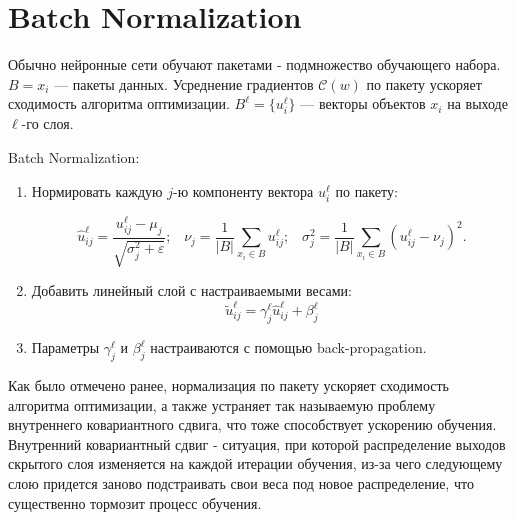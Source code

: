 \documentclass[11pt, oneside]{article}   	%
\begin{document}
	
	\section{Batch Normalization}
	Обычно нейронные сети обучают пакетами - подмножество обучающего набора. $B = {x_i}$ --- пакеты данных.
	Усреднение градиентов $\mathcal{C}(w)$ по пакету ускоряет сходимость алгоритма оптимизации. $B^{\ell} = \{u_i^{\ell}\}$ --- векторы объектов $x_i$ на выходе $\ell$-го слоя.
	
	Batch Normalization:
	\begin{enumerate}
		\item Нормировать каждую $j$-ю компоненту вектора $u_i^{\ell}$ по пакету:
		
		$$ \hat{u}_{ij}^{\ell} = \dfrac{u_{ij}^{\ell} - \mu_j}{\sqrt{\sigma^2_j + \varepsilon}}; \; \; \;
		\nu_j = \dfrac{1}{|B|} \sum\limits_{x_i \in B} u_{ij}^{\ell}; \; \; \;
		\sigma^2_j = \dfrac{1}{|B|} \sum\limits_{x_i \in B} (u_{ij}^{\ell} - \nu_j)^2. $$
		\item Добавить линейный слой с настраиваемыми весами:
		$$ \tilde{u}_{ij}^{\ell} = \gamma_j^\ell \hat{u}_{ij}^{\ell} + \beta_j^\ell $$
		\item Параметры $\gamma_j^\ell$ и $\beta_j^\ell$ настраиваются с помощью back-propagation.
	\end{enumerate}
	
	Как было отмечено ранее, нормализация по пакету ускоряет сходимость алгоритма оптимизации, а также устраняет так называемую проблему внутреннего ковариантного сдвига, что тоже способствует ускорению обучения. Внутренний ковариантный сдвиг - ситуация, при которой распределение выходов скрытого слоя изменяется на каждой итерации обучения, из-за чего следующему слою придется заново подстраивать свои веса под новое распределение, что существенно тормозит процесс обучения.
	
\end{document}

